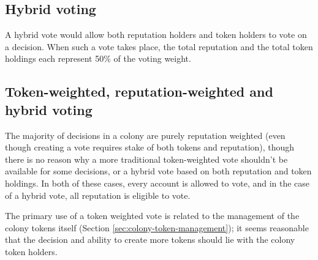 \subsection{Hybrid voting}
A hybrid vote would allow both reputation holders and token holders to vote on a decision. When such a vote takes place, the total reputation and the total token holdings each represent 50\% of the voting weight.

\subsection{Token-weighted, reputation-weighted and hybrid voting}
The majority of decisions in a colony are purely reputation weighted (even though creating a vote requires stake of both tokens and reputation), though there is no reason why a more traditional token-weighted vote shouldn't be available for some decisions, or a hybrid vote based on both reputation and token holdings. In both of these cases, every account is allowed to vote, and in the case of a hybrid vote, all reputation is eligible to vote.

The primary use of a token weighted vote is related to the management of the colony tokens itself (Section \ref{sec:colony-token-management}); it seems reasonable that the decision and ability to create more tokens should lie with the colony token holders.
